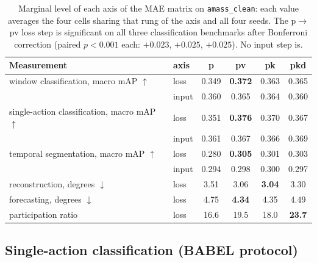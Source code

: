 \begin{table}[t]
\centering
\small
\begin{tabular}{llcccc}
\toprule
Measurement & axis & \textsf{p} & \textsf{pv} & \textsf{pk} & \textsf{pkd} \\
\midrule
window classification, macro mAP $\uparrow$  & loss  & 0.349 & \textbf{0.372} & 0.363 & 0.365 \\
                                     & input & 0.360 & 0.365 & 0.364 & 0.360 \\
single-action classification, macro mAP $\uparrow$ & loss  & 0.351 & \textbf{0.376} & 0.370 & 0.367 \\
                                     & input & 0.361 & 0.367 & 0.366 & 0.369 \\
temporal segmentation, macro mAP $\uparrow$ & loss  & 0.280 & \textbf{0.305} & 0.301 & 0.303 \\
                                     & input & 0.294 & 0.298 & 0.300 & 0.297 \\
\midrule
reconstruction, degrees $\downarrow$ & loss  & 3.51 & 3.06 & \textbf{3.04} & 3.30 \\
forecasting, degrees $\downarrow$    & loss  & 4.75 & \textbf{4.34} & 4.35 & 4.49 \\
participation ratio                  & loss  & 16.6 & 19.5 & 18.0 & \textbf{23.7} \\
\bottomrule
\end{tabular}
\caption{Marginal level of each axis of the MAE matrix on \texttt{amass\_clean}: each value
averages the four cells sharing that rung of the axis and all four seeds. The
\textsf{p}$\to$\textsf{pv} loss step is significant on all three classification benchmarks
after Bonferroni correction (paired $p<0.001$ each: $+0.023$, $+0.025$, $+0.025$). No input
step is.}
\label{tab:exp-ladder}
\end{table}

\subsection{Single-action classification (BABEL protocol)}
\label{sec:exp-babel-official}

